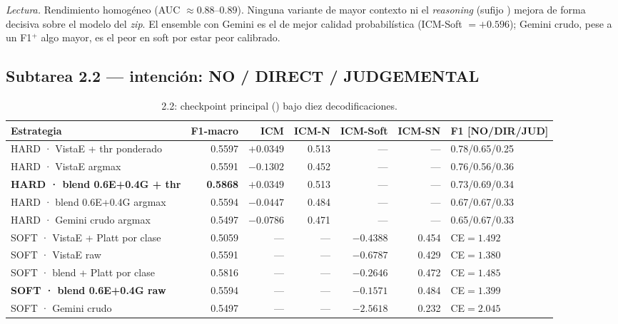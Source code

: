 \documentclass[11pt,a4paper]{article}
\newcommand{\best}[1]{\textbf{#1}}
\newcommand{\code}[1]{\texttt{\detokenize{#1}}}
\begin{document}
\noindent\emph{Lectura.} Rendimiento homogéneo (AUC $\approx0.88$--$0.89$). Ninguna variante de
mayor contexto ni el \emph{reasoning} (sufijo \code{_R}) mejora de forma decisiva sobre el modelo
del \emph{zip}. El ensemble con Gemini es el de mejor calidad probabilística (ICM-Soft $=+0.596$);
Gemini crudo, pese a un F1$^{+}$ algo mayor, es el peor en soft por estar peor calibrado.

\subsection{Subtarea 2.2 --- intención: NO / DIRECT / JUDGEMENTAL}
\begin{table}[h]\centering\small
\caption{2.2: checkpoint principal (\code{vista_e_task22_best}) bajo diez decodificaciones.}
\setlength\tabcolsep{4pt}
\begin{tabular}{@{}lrrrrrl@{}}
\toprule
Estrategia & F1-macro & ICM & ICM-N & ICM-Soft & ICM-SN & F1 [NO/DIR/JUD] \\
\midrule
HARD · VistaE + thr ponderado          & 0.5597 & $+0.0349$ & 0.513 & --- & --- & 0.78/0.65/0.25 \\
HARD · VistaE argmax                   & 0.5591 & $-0.1302$ & 0.452 & --- & --- & 0.76/0.56/0.36 \\
\best{HARD · blend 0.6E+0.4G + thr}    & \best{0.5868} & $+0.0349$ & 0.513 & --- & --- & 0.73/0.69/0.34 \\
HARD · blend 0.6E+0.4G argmax          & 0.5594 & $-0.0447$ & 0.484 & --- & --- & 0.67/0.67/0.33 \\
HARD · Gemini crudo argmax             & 0.5497 & $-0.0786$ & 0.471 & --- & --- & 0.65/0.67/0.33 \\
SOFT · VistaE + Platt por clase        & 0.5059 & --- & --- & $-0.4388$ & 0.454 & CE$=1.492$ \\
SOFT · VistaE raw                      & 0.5591 & --- & --- & $-0.6787$ & 0.429 & CE$=1.380$ \\
SOFT · blend + Platt por clase         & 0.5816 & --- & --- & $-0.2646$ & 0.472 & CE$=1.485$ \\
\best{SOFT · blend 0.6E+0.4G raw}      & 0.5594 & --- & --- & \best{$-0.1571$} & 0.484 & CE$=1.399$ \\
SOFT · Gemini crudo                    & 0.5497 & --- & --- & $-2.5618$ & 0.232 & CE$=2.045$ \\
\bottomrule
\end{tabular}
\end{table}
\end{document}
